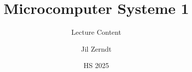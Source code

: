 \documentclass[a4paper, fontsize = 8pt, landscape]{scrartcl}
\title{Microcomputer Systeme 1}
\subtitle{Lecture Content}
\author{Jil Zerndt}
\date{HS 2025}
\begin{document}
\begin{multicols}{2}
	\thispagestyle{TitlePageStyle}
	\maketitleinfo
	\sffamily
	
	\raggedcolumns
	\columnbreak 
\end{multicols}
\end{document}
